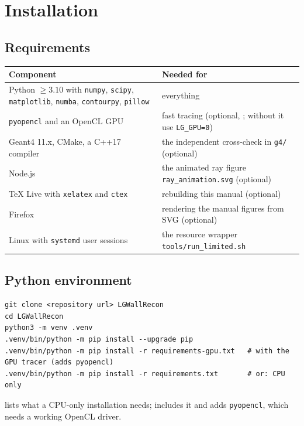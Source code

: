 \documentclass[11pt,a4paper]{article}
\newcommand{\code}[1]{\texttt{#1}}
\begin{document}
\section{Installation}

\subsection{Requirements}

\begin{tabularx}{\textwidth}{@{}L{3.6cm}Y@{}}
\toprule
Component & Needed for \\
\midrule
Python $\ge 3.10$ with \code{numpy}, \code{scipy}, \code{matplotlib}, \code{numba},
\code{contourpy}, \code{pillow} & everything \\
\code{pyopencl} and an OpenCL GPU & fast tracing (optional, ; without it use \code{LG\_GPU=0}) \\
Geant4 11.x, CMake, a C++17 compiler & the independent cross-check in \code{g4/} (optional) \\
Node.js & the animated ray figure \code{ray\_animation.svg} (optional) \\
TeX Live with \code{xelatex} and \code{ctex} & rebuilding this manual (optional) \\
Firefox & rendering the manual figures from SVG (optional) \\
Linux with \code{systemd} user sessions & the resource wrapper \code{tools/run\_limited.sh} \\
\bottomrule
\end{tabularx}

\subsection{Python environment}

\begin{lstlisting}
git clone <repository url> LGWallRecon
cd LGWallRecon
python3 -m venv .venv
.venv/bin/python -m pip install --upgrade pip
.venv/bin/python -m pip install -r requirements-gpu.txt   # with the GPU tracer (adds pyopencl)
.venv/bin/python -m pip install -r requirements.txt       # or: CPU only
\end{lstlisting}
 lists what a CPU-only installation needs; 
includes it and adds \code{pyopencl}, which needs a working OpenCL driver.
\end{document}
